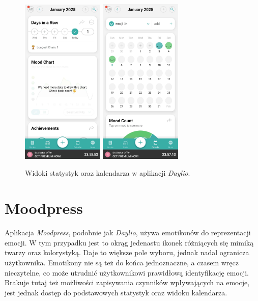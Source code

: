 \documentclass[inz, shortabstract]{iithesis}
\begin{document}
\begin{figure}[!hb]
\centering
\includegraphics[width=0.35\textwidth]{daylio3.jpg} 
\includegraphics[width=0.35\textwidth]{daylio4.jpg} 
\caption{Widoki statystyk oraz kalendarza w aplikacji \textit{Daylio}.}
\end{figure}

\section{Moodpress}
Aplikacja \textit{Moodpress}, podobnie jak \textit{Daylio}, używa emotikonów do reprezentacji emocji. W tym przypadku jest to okrąg jedenastu ikonek różniących się mimiką twarzy oraz kolorystyką. Daje to większe pole wyboru, jednak nadal ogranicza użytkownika. Emotikony nie są też do końca jednoznaczne, a czasem wręcz nieczytelne, co może utrudnić użytkownikowi prawidłową identyfikację emocji. Brakuje tutaj też możliwości zapisywania czynników wpływających na emocje, jest jednak dostęp do podstawowych statystyk oraz widoku kalendarza.
\end{document}
